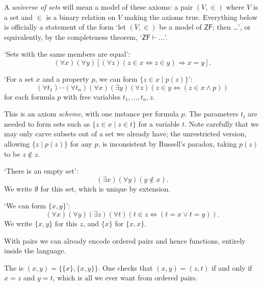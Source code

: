 \documentclass[a4paper]{scrartcl}
\newcommand{\ZF}{\mathsf{ZF}}
\begin{document}
A \emph{universe of sets} will mean a model of these axioms: a pair $(V, \in)$ where $V$ is a set and $\in$ is a binary relation on $V$ making the axioms true. Everything below is officially a statement of the form `let $(V, \in)$ be a model of $\ZF$; then \dots', or equivalently, by the completeness theorem, `$\ZF \vdash \dots$'.

\begin{axiom}[Extension]
  `Sets with the same members are equal':
  $$
  (\forall x)(\forall y)[(\forall z)(z \in x \Leftrightarrow z \in y) \Rightarrow x = y].
  $$
\end{axiom}

\begin{axiom}[Separation]
`For a set $x$ and a property $p$, we can form $\{z \in x \mid p(z)\}$':
$$
(\forall t_1)\cdots (\forall t_n) (\forall x)(\exists y)(\forall z)(z \in y \Leftrightarrow (z \in x \land p))
$$
for each formula $p$ with free variables $t_1, \dots, t_n, z$.
\end{axiom}

This is an axiom \emph{scheme}, with one instance per formula $p$. The parameters $t_i$ are needed to form sets such as $\{z \in x \mid z \in t\}$ for a variable $t$. Note carefully that we may only carve subsets out of a set we already have; the unrestricted version, allowing $\{z \mid p(z)\}$ for any $p$, is inconsistent by Russell's paradox, taking $p(z)$ to be $z \notin z$.

\begin{axiom}
  `There is an empty set':
  $$
  (\exists x) (\forall y)(y \notin x).
  $$
  We write $\emptyset$ for this set, which is unique by extension.
\end{axiom}

\begin{axiom}
  `We can form $\{x, y\}$':
  $$
(\forall x)(\forall y)(\exists z)(\forall t)(t \in z \Leftrightarrow (t = x \lor t = y)).
  $$
  We write $\{x, y\}$ for this $z$, and $\{x\}$ for $\{x, x\}$.
\end{axiom}

With pairs we can already encode ordered pairs and hence functions, entirely inside the language.

\begin{definition}
  The  is $(x, y) = \{\{x\}, \{x, y\}\}$. One checks that $(x, y) = (z, t)$ if and only if $x = z$ and $y = t$, which is all we ever want from ordered pairs.
\end{definition}
\end{document}
